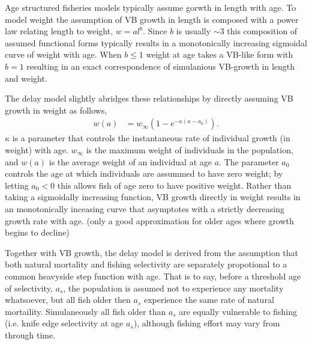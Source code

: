 %
Age structured fisheries models typically assume %
 gorwth in length with age. To model 
weight the assumption of VB growth in length is composed with a power law 
relating length to weight, $w=al^b$. 
%
Since $b$ is usually $\sim3$ this composition of assumed functional forms 
typically results in a monotonically increasing sigmoidal curve of weight with age.
When $b\le1$ weight at age takes a VB-like form with $b=1$ resulting in 
an exact correspondence of simulanious VB-growth in length and weight.

%
The delay model slightly abridges these relationships by directly assuming VB 
growth in weight as follows,
%
\begin{align}
w(a) &= w_\infty(1-e^{-\kappa (a-a_0)}). \label{vbGrowth}
\end{align}
%
$\kappa$ is a parameter that controls the instantaneous rate of individual 
growth (in weight) with age. $w_\infty$ is the maximum weight of individuals 
in the population, and $w(a)$ is the average weight of an individual at 
age $a$. The parameter $a_0$ controls the age at which individuals are assummed 
to have zero weight; by letting $a_0<0$ this allows fish of age zero to have 
positive weight. Rather than taking a sigmoidally increasing function, VB growth 
directly in weight results in an monotonically inceasing curve that asymptotes 
with a strictly decreasing growth rate with age. 
{\color{red}(only a good approximation for older ages where growth begins to decline)}

%
Together with VB growth, the delay model is derived from the assumption that 
both natural mortality and fishing selectivity are separately propotional 
to a common heavyside step function with age. That is to say, before a threshold 
age of selectivity, $a_s$, the population is assumed not to experience any 
mortality whatsoever, but all fish older then $a_s$ experience the same rate 
of natural mortaility. Simulaneously all fish older than $a_s$ are equally 
vulnerable to fishing (i.e. knife edge selectivity at age $a_s$), although 
fishing effort may vary from through time. 

